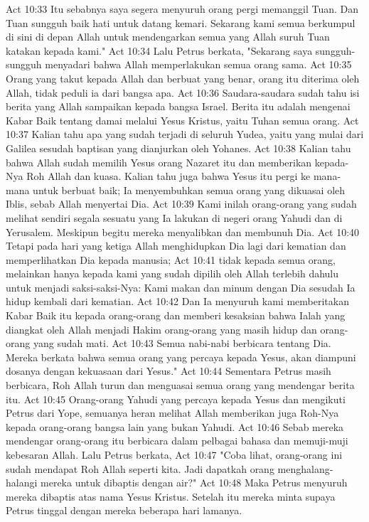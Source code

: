 Act 10:33  Itu sebabnya saya segera menyuruh orang pergi memanggil Tuan. Dan Tuan sungguh baik hati untuk datang kemari. Sekarang kami semua berkumpul di sini di depan Allah untuk mendengarkan semua yang Allah suruh Tuan katakan kepada kami."
Act 10:34  Lalu Petrus berkata, "Sekarang saya sungguh-sungguh menyadari bahwa Allah memperlakukan semua orang sama.
Act 10:35  Orang yang takut kepada Allah dan berbuat yang benar, orang itu diterima oleh Allah, tidak peduli ia dari bangsa apa.
Act 10:36  Saudara-saudara sudah tahu isi berita yang Allah sampaikan kepada bangsa Israel. Berita itu adalah mengenai Kabar Baik tentang damai melalui Yesus Kristus, yaitu Tuhan semua orang.
Act 10:37  Kalian tahu apa yang sudah terjadi di seluruh Yudea, yaitu yang mulai dari Galilea sesudah baptisan yang dianjurkan oleh Yohanes.
Act 10:38  Kalian tahu bahwa Allah sudah memilih Yesus orang Nazaret itu dan memberikan kepada-Nya Roh Allah dan kuasa. Kalian tahu juga bahwa Yesus itu pergi ke mana-mana untuk berbuat baik; Ia menyembuhkan semua orang yang dikuasai oleh Iblis, sebab Allah menyertai Dia.
Act 10:39  Kami inilah orang-orang yang sudah melihat sendiri segala sesuatu yang Ia lakukan di negeri orang Yahudi dan di Yerusalem. Meskipun begitu mereka menyalibkan dan membunuh Dia.
Act 10:40  Tetapi pada hari yang ketiga Allah menghidupkan Dia lagi dari kematian dan memperlihatkan Dia kepada manusia;
Act 10:41  tidak kepada semua orang, melainkan hanya kepada kami yang sudah dipilih oleh Allah terlebih dahulu untuk menjadi saksi-saksi-Nya: Kami makan dan minum dengan Dia sesudah Ia hidup kembali dari kematian.
Act 10:42  Dan Ia menyuruh kami memberitakan Kabar Baik itu kepada orang-orang dan memberi kesaksian bahwa Ialah yang diangkat oleh Allah menjadi Hakim orang-orang yang masih hidup dan orang-orang yang sudah mati.
Act 10:43  Semua nabi-nabi berbicara tentang Dia. Mereka berkata bahwa semua orang yang percaya kepada Yesus, akan diampuni dosanya dengan kekuasaan dari Yesus."
Act 10:44  Sementara Petrus masih berbicara, Roh Allah turun dan menguasai semua orang yang mendengar berita itu.
Act 10:45  Orang-orang Yahudi yang percaya kepada Yesus dan mengikuti Petrus dari Yope, semuanya heran melihat Allah memberikan juga Roh-Nya kepada orang-orang bangsa lain yang bukan Yahudi.
Act 10:46  Sebab mereka mendengar orang-orang itu berbicara dalam pelbagai bahasa dan memuji-muji kebesaran Allah. Lalu Petrus berkata,
Act 10:47  "Coba lihat, orang-orang ini sudah mendapat Roh Allah seperti kita. Jadi dapatkah orang menghalang-halangi mereka untuk dibaptis dengan air?"
Act 10:48  Maka Petrus menyuruh mereka dibaptis atas nama Yesus Kristus. Setelah itu mereka minta supaya Petrus tinggal dengan mereka beberapa hari lamanya.
